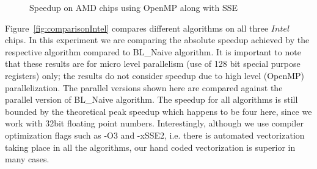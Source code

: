 \documentclass{IEEEtran}
\begin{document}
\begin{figure}[t!]
\begin{centering} 
\end{centering}
\caption{Speedup on AMD chips  using OpenMP along with SSE} 
\label{fig:comparisonFinalAMD} 
\end{figure} 


Figure~\ref{fig:comparisonIntel} compares different algorithms on all three $Intel$ chips. In this experiment we are comparing the absolute speedup achieved by the respective algorithm compared to BL\_Naive algorithm. It is important to note that these results are for micro level parallelism (use of 128 bit special purpose registers) only; the results do not consider speedup due to high level (OpenMP) parallelization. The parallel versions shown here are compared against the parallel version of BL\_Naive algorithm. The speedup for all algorithms is still bounded by the theoretical peak speedup which happens to be four here, since we work with 32bit floating point numbers. Interestingly, although we use compiler optimization flags such as -O3 and -xSSE2, i.e. there is automated vectorization taking place in all the algorithms, our hand coded vectorization is superior in many cases.
\end{document}
